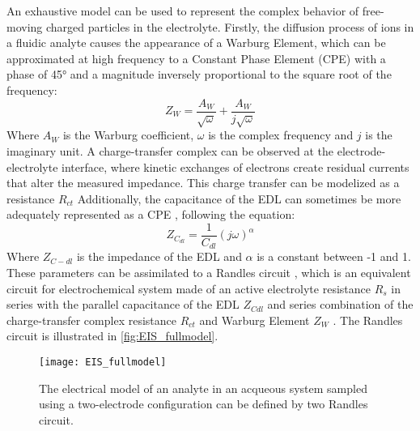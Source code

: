 An exhaustive model can be used to represent the complex behavior of free-moving charged particles in the electrolyte. Firstly, the diffusion process of ions in a fluidic analyte causes the appearance of a Warburg Element, which can be approximated at high frequency to a Constant Phase Element (CPE) with a phase of 45° and a magnitude inversely proportional to the square root of the frequency:
\begin{equation}
   Z_W = \frac{A_W}{\sqrt{\omega}} + \frac{A_W}{j \sqrt{\omega}}
\end{equation}
Where $A_W$ is the Warburg coefficient, $\omega$ is the complex frequency and $j$ is the imaginary unit. A charge-transfer complex can be observed at the electrode-electrolyte interface, where kinetic exchanges of electrons create residual currents that alter the measured impedance. This charge transfer can be modelized as a resistance $R_{ct}$ Additionally, the capacitance of the EDL can sometimes be more adequately represented as a CPE \cite{gamryBasicsEIS}, following the equation:
\begin{equation}
   Z_{C_{dl}} = \frac{1}{C_{dl}} (j\omega)^\alpha
\end{equation}
Where $Z_{C-{dl}}$ is the impedance of the EDL and $\alpha$ is a constant between -1 and 1. These parameters can be assimilated to a Randles circuit \cite{Randles1947}, which is an equivalent circuit for electrochemical system made of an active electrolyte resistance $R_s$ in series with the parallel capacitance of the EDL $Z_{C{dl}}$ and series combination of the charge-transfer complex resistance $R_{ct}$ and Warburg Element $Z_W$ \cite{gamryBasicsEIS}. The Randles circuit is illustrated in \autoref{fig:EIS_fullmodel}. \par
\begin{figure}[h]
    \centering
    \texttt{[image: EIS\_fullmodel]}
    \caption{The electrical model of an analyte in an acqueous system sampled using a two-electrode configuration can be defined by two Randles circuit.}
    \label{fig:EIS_fullmodel}
\end{figure}

